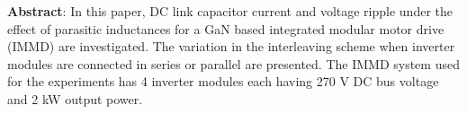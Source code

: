 \vspace{-1em}
\textbf{Abstract}: 
In this paper, DC link capacitor current and voltage ripple under the effect of parasitic inductances for a GaN based integrated modular motor drive (IMMD) are investigated. The variation in the interleaving scheme when inverter modules are connected in series or parallel are presented. The IMMD system used for the experiments has 4 inverter modules each having 270 V DC bus voltage and 2 kW output power.